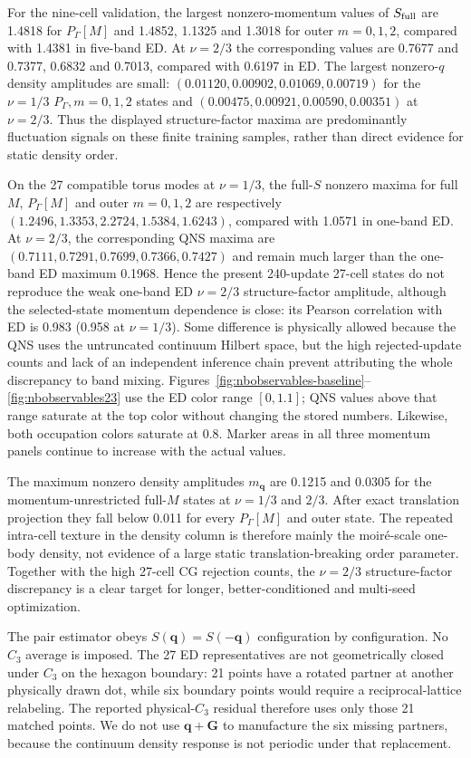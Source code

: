 For the nine-cell validation, the largest nonzero-momentum values of $S_{\rm full}$ are
1.4818 for $P_\Gamma[M]$ and 1.4852, 1.1325 and 1.3018 for outer
$m=0,1,2$, compared with 1.4381 in five-band ED.  At $\nu=2/3$ the
corresponding values are 0.7677 and 0.7377, 0.6832 and 0.7013, compared with
0.6197 in ED.  The largest nonzero-$q$ density amplitudes are small:
$(0.01120,0.00902,0.01069,0.00719)$ for the $\nu=1/3$
$P_\Gamma,m=0,1,2$ states and
$(0.00475,0.00921,0.00590,0.00351)$ at $\nu=2/3$.  Thus the displayed
structure-factor maxima are predominantly fluctuation signals on these
finite training samples, rather than direct evidence for static density
order.

On the 27 compatible torus modes at $\nu=1/3$, the full-$S$ nonzero maxima for full $M$,
$P_\Gamma[M]$ and outer $m=0,1,2$ are respectively
$(1.2496,1.3353,2.2724,1.5384,1.6243)$, compared with 1.0571 in one-band
ED. At $\nu=2/3$, the corresponding
QNS maxima are $(0.7111,0.7291,0.7699,0.7366,0.7427)$ and
remain much larger than the one-band ED maximum 0.1968. Hence the present
240-update 27-cell states do not reproduce the weak one-band ED $\nu=2/3$
structure-factor amplitude, although the selected-state momentum dependence
is close: its Pearson correlation with ED is 0.983 (0.958 at $\nu=1/3$).
Some difference is physically allowed because the QNS
uses the untruncated continuum Hilbert space, but the high rejected-update
counts and lack of an independent inference chain prevent attributing the
whole discrepancy to band mixing. Figures~\ref{fig:nbobservables-baseline}--
\ref{fig:nbobservables23} use the ED color range $[0,1.1]$; QNS values above
that range saturate at the top color without changing the stored numbers.
Likewise, both occupation colors saturate at 0.8. Marker areas in all three
momentum panels continue to increase with the actual values.

The maximum nonzero density amplitudes $m_{\bm q}$ are 0.1215 and 0.0305 for
the momentum-unrestricted full-$M$ states at $\nu=1/3$ and $2/3$.
After exact translation projection they fall below 0.011 for every
$P_\Gamma[M]$ and outer state. The repeated intra-cell texture in the density
column is therefore mainly the moir\'e-scale one-body density, not evidence of
a large static translation-breaking order parameter. Together with the high
27-cell CG rejection counts, the $\nu=2/3$ structure-factor discrepancy is a
clear target for longer, better-conditioned and multi-seed optimization.

The pair estimator obeys $S(\bm q)=S(-\bm q)$ configuration by configuration.
No $C_3$ average is imposed. The 27 ED representatives are not geometrically
closed under $C_3$ on the hexagon boundary: 21 points have a rotated partner
at another physically drawn dot, while six boundary points would require a
reciprocal-lattice relabeling. The reported physical-$C_3$ residual therefore
uses only those 21 matched points. We do not use $\bm q+\bm G$ to manufacture
the six missing partners, because the continuum density response is not
periodic under that replacement.

